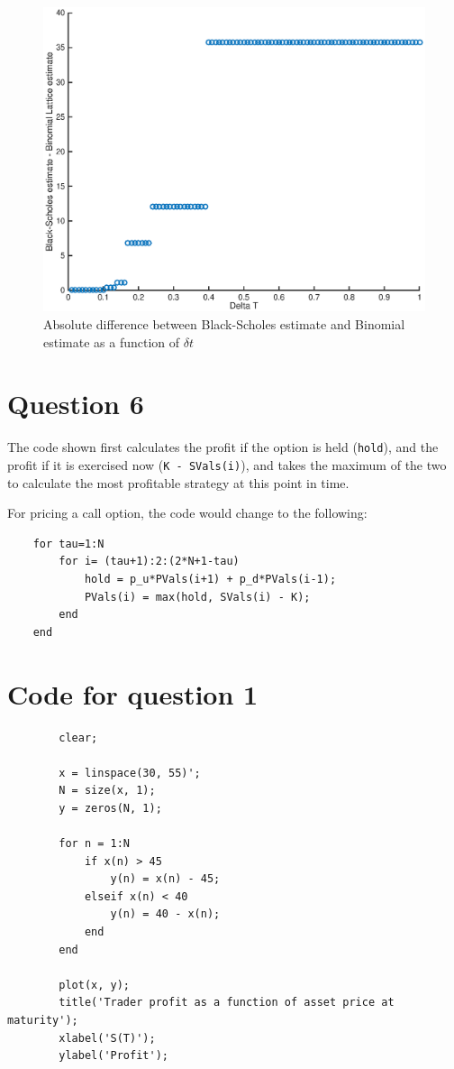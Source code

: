 \documentclass[12pt]{article}
\begin{document}
	\begin{figure}
		\centering
		\includegraphics[width=0.5\linewidth]{figures/p5.eps}
		\caption{Absolute difference between Black-Scholes estimate and Binomial estimate as a function of $\delta t$}
		\label{fig:p5}
	\end{figure}

	\section{Question 6}

	The code shown first calculates the profit if the option is held (\texttt{hold}), and the profit if it is exercised now (\texttt{K - SVals(i)}), and takes the maximum of the two to calculate the most profitable strategy at this point in time.

	For pricing a call option, the code would change to the following:

	\begin{verbatim}
	for tau=1:N
	    for i= (tau+1):2:(2*N+1-tau)
	        hold = p_u*PVals(i+1) + p_d*PVals(i-1);
	        PVals(i) = max(hold, SVals(i) - K);
	    end
	end
	\end{verbatim}

	\clearpage
	\appendix

	\section{Code for question 1}

	\begin{verbatim}
		clear;

		x = linspace(30, 55)';
		N = size(x, 1);
		y = zeros(N, 1);

		for n = 1:N
		    if x(n) > 45
		        y(n) = x(n) - 45;
		    elseif x(n) < 40
		        y(n) = 40 - x(n);
		    end
		end

		plot(x, y);
		title('Trader profit as a function of asset price at maturity');
		xlabel('S(T)');
		ylabel('Profit');
	\end{verbatim}
\end{document}
